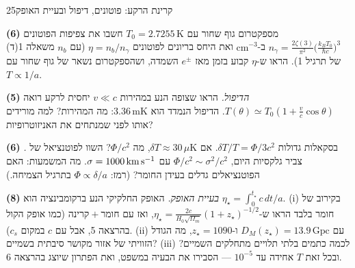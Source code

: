 \documentclass[11pt,a4paper]{article}
\begin{document}
\begin{question}{קרינת הרקע: פוטונים, דיפול ובעיית האופק}{25}
\begin{parts}
\item \textbf{(6)} מספקטרום גוף שחור עם $T_0=2.7255\,\mathrm K$ חשבו את צפיפות הפוטונים $n_\gamma=\frac{2\zeta(3)}{\pi^2}\big(\frac{k_BT_0}{\hbar c}\big)^3$ ב-$\mathrm{cm^{-3}}$ ואת היחס בריונים לפוטונים $\eta=n_b/n_\gamma$ (עם $n_b$ משאלה 1(ד) של תרגיל 1). הראו ש-$\eta$ קבוע בזמן מאז $e^\pm$ השמדה, ושהספקטרום נשאר של גוף שחור עם $T\propto1/a$.
\item \textbf{(5)} \emph{הדיפול.} הראו שצופה הנע במהירות $v\ll c$ יחסית לרקע רואה $T(\theta)\simeq T_0(1+\frac vc\cos\theta)$. הדיפול הנמדד הוא $3.36\,\mathrm{mK}$: מה המהירות? למה מורידים אותו לפני שמנתחים את האניזוטרופיות?
\item \textbf{(6)} \emph{.} בסקאלות גדולות $\delta T/T=\Phi/3c^2$. אם $\delta T\approx30\,\mu\mathrm K$, מה $\Phi/c^2$? השוו לפוטנציאל של צביר גלקסיות היום, $\Phi/c^2\sim\sigma^2/c^2$ עם $\sigma=1000\,\mathrm{km\,s^{-1}}$. מה המשמעות: האם הפוטנציאלים גדלים בעידן החומר? (רמז: $\Phi\propto\delta/a$ בתרגיל הצמיחה.)
\item \textbf{(8)} \emph{בעיית האופק.} האופק החלקיקי הנע ברקומבינציה הוא $\eta_\star=\int_0^{t_\star}c\,dt/a$. (i) בקירוב של חומר בלבד הראו ש-$\eta_\star=\frac{2c}{H_0\sqrt{\Omega_m}}(1+z_\star)^{-1/2}$, ואז עם חומר${}+{}$קרינה (כמו אופק הקול בהרצאה 5, אבל עם $c$ במקום $c_s$). (ii) עם $D_M(z_\star)=13.9\,\mathrm{Gpc}$ ו-$z_\star=1090$, מה הגודל הזוויתי של אזור מקושר סיבתית בשמיים? (iii) לכמה כתמים בלתי תלויים מתחלקים השמיים? ובכל זאת $T$ אחידה עד $10^{-5}$ --- הסבירו את הבעיה במשפט, ואת הפתרון שיוצג בהרצאה 6.
\end{parts}
\end{question}
\end{document}
